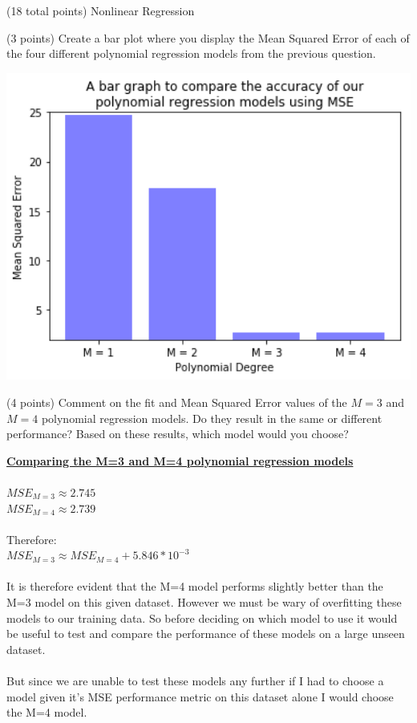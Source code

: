 \documentclass[12pt]{article}
\begin{document}
\begin{question}{(18 total points) Nonlinear Regression}
\begin{subquestion}{(3 points) Create a bar plot where you display the Mean Squared Error of each of the four different polynomial regression models from the previous question.}
\begin{answerbox}{35em}
\includegraphics [width=1\textwidth]{images/q2b-graph.png}
\end{answerbox}



\end{subquestion}


%
%
\begin{subquestion}{(4 points) Comment on the fit and Mean Squared Error values of the $M=3$ and $M=4$ polynomial regression models. 
Do they result in the same or different performance? 
Based on these results, which model would you choose?}


\begin{answerbox}{23em}
\large{\textbf{\underline{Comparing the M=3 and M=4 polynomial regression models}}}\\
\\
\normalsize{
$MSE_{M=3} \approx 2.745$\\
$MSE_{M=4} \approx 2.739$\\
\\
Therefore:\\
$MSE_{M=3} \approx MSE_{M=4} + 5.846 * 10^{-3}$\\
\\
It is therefore evident that the M=4 model performs slightly better than the M=3 model on this given dataset. However we must be wary of overfitting these models to our training data. So before deciding on which model to use it would be useful to test and compare the performance of these models on a large unseen dataset.\\
\\
But since we are unable to test these models any further if I had to choose a model given it's MSE performance metric on this dataset alone I would choose the M=4 model.
}
\end{answerbox}




\end{subquestion}
\end{question}
\end{document}
